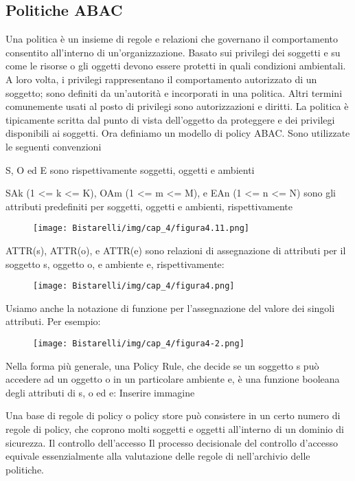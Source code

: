 \subsection{Politiche ABAC}
Una politica è un insieme di regole e relazioni che governano il comportamento consentito all'interno di un'organizzazione. Basato sui privilegi dei soggetti e su come le risorse o gli oggetti devono essere protetti in quali condizioni ambientali. A loro volta, i privilegi rappresentano il comportamento autorizzato di un soggetto; sono definiti da un'autorità e incorporati in una politica. Altri termini comunemente usati al posto di privilegi sono autorizzazioni e diritti. La politica è tipicamente scritta dal punto di vista dell'oggetto da proteggere e dei privilegi disponibili ai soggetti. Ora definiamo un modello di policy ABAC. Sono utilizzate le seguenti convenzioni


S, O ed E sono rispettivamente soggetti, oggetti e ambienti

SAk (1 <= k <= K), OAm (1 <= m <= M), e EAn (1 <= n <= N) sono gli attributi predefiniti per soggetti, oggetti e ambienti, rispettivamente

\begin{figure}[H]
	\centering
    \texttt{[image: Bistarelli/img/cap\_4/figura4.11.png]}
\end{figure}

ATTR(s), ATTR(o), e ATTR(e) sono relazioni di assegnazione di attributi per il soggetto s, oggetto o, e ambiente e, rispettivamente:

\begin{figure}[H]
	\centering
    \texttt{[image: Bistarelli/img/cap\_4/figura4.png]}
\end{figure}

Usiamo anche la notazione di funzione per l'assegnazione del valore dei singoli attributi. Per esempio:

\begin{figure}[H]
	\centering
    \texttt{[image: Bistarelli/img/cap\_4/figura4-2.png]}
\end{figure}

Nella forma più generale, una Policy Rule, che decide se un soggetto s può accedere ad un oggetto o in un particolare ambiente e, è una funzione booleana degli attributi di s, o ed e:
Inserire immagine

Una base di regole di policy o policy store può consistere in un certo numero di regole di policy, che coprono molti soggetti e oggetti all'interno di un dominio di sicurezza. Il controllo dell'accesso Il processo decisionale del controllo d'accesso equivale essenzialmente alla valutazione delle regole di nell'archivio delle politiche.

